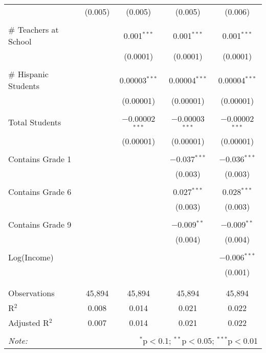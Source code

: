\begin{table}[!htbp]
\begin{tabular}{@{\extracolsep{-2pt}}lcccc}
  & (0.005) & (0.005) & (0.005) & (0.006) \\ 
  & & & & \\ 
 \# Teachers at School &  & 0.001$^{***}$ & 0.001$^{***}$ & 0.001$^{***}$ \\ 
  &  & (0.0001) & (0.0001) & (0.0001) \\ 
  & & & & \\ 
 \# Hispanic Students &  & 0.00003$^{***}$ & 0.00004$^{***}$ & 0.00004$^{***}$ \\ 
  &  & (0.00001) & (0.00001) & (0.00001) \\ 
  & & & & \\ 
 Total Students &  & $-$0.00002$^{***}$ & $-$0.00003$^{***}$ & $-$0.00002$^{***}$ \\ 
  &  & (0.00001) & (0.00001) & (0.00001) \\ 
  & & & & \\ 
 Contains Grade 1 &  &  & $-$0.037$^{***}$ & $-$0.036$^{***}$ \\ 
  &  &  & (0.003) & (0.003) \\ 
  & & & & \\ 
 Contains Grade 6 &  &  & 0.027$^{***}$ & 0.028$^{***}$ \\ 
  &  &  & (0.003) & (0.003) \\ 
  & & & & \\ 
 Contains Grade 9 &  &  & $-$0.009$^{**}$ & $-$0.009$^{**}$ \\ 
  &  &  & (0.004) & (0.004) \\ 
  & & & & \\ 
 Log(Income) &  &  &  & $-$0.006$^{***}$ \\ 
  &  &  &  & (0.001) \\ 
  & & & & \\ 
\hline \\[-1.8ex] 
Observations & 45,894 & 45,894 & 45,894 & 45,894 \\ 
R$^{2}$ & 0.008 & 0.014 & 0.021 & 0.022 \\ 
Adjusted R$^{2}$ & 0.007 & 0.014 & 0.021 & 0.022 \\ 
\hline 
\hline \\[-1.8ex] 
\textit{Note:}  & \multicolumn{4}{r}{$^{*}$p$<$0.1; $^{**}$p$<$0.05; $^{***}$p$<$0.01} \\ 
\end{tabular} 
\end{table} 
